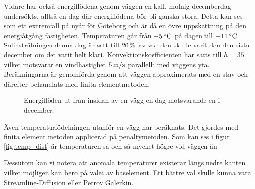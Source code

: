 Vidare har också energiflödena genom väggen en kall, molnig decemberdag undersökts, alltså en dag där energiflödena bör bli ganska stora. Detta kan ses som ett extremfall på nyår för Göteborg och är då en övre uppskattning på den energiåtgång fastigheten.
 Temperaturen går från $\unit[-5]{^\circ C}$ på dagen till $\unit[-11]{^\circ C}$ Solinstrålningen denna dag är satt till $\unit[20]{\%}$ av vad den skulle varit den den sista december om det varit helt klart. Konvektionskoefficienten har satts till $h=35$ vilket motsvarar en vindhastighet $\unit[5]{m/s}$ parallellt med väggens yta. Beräkningarna är genomförda genom att väggen approximerats med en stav och därefter behandlats med
finita elementmetoden.


\begin{figure}[hpbt]
\centering
{}\vspace{5mm}

\caption{Energiflöden ut från insidan av en vägg en dag motsvarande en i december.
}
\end{figure}


Även temperaturfödelningen utanför en vägg har beräknats. Det gjordes med finita element metoden applicerad på penaltymetoden. Som kan ses i figur \ref{fig:temp_dist} är temperaturen så och så mycket högre vid väggen än %

Dessutom kan vi notera att anomala temperaturer existerar längs nedre kanten vilket möjligen kan bero på valet av baselement. Ett bättre val skulle kunna vara Streamline-Diffusion eller Petrov Galerkin.

